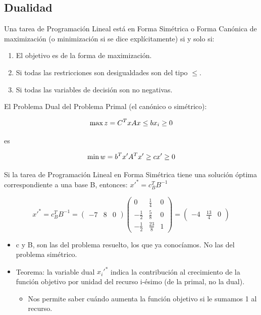 \documentclass[12pt, twoside, openright]{report} %
\begin{document}
\subsection{Dualidad}

Una tarea de Programación Lineal está en Forma Simétrica o Forma
Canónica de maximización (o minimización si se dice explícitamente) si
y solo si:

\begin{enumerate}
	\item El objetivo es de la forma de maximización.
	\item Si todas las restricciones son desigualdades son del tipo $\leq$.
	\item Si todas las variables de decisión son no negativas.
\end{enumerate}

El Problema Dual del Problema Primal (el canónico o simétrico):

\begin{minipage}{.5\linewidth}
	$$\max z = C^{T}x \\
		Ax\leq b \\
		x_{i} \geq 0$$
\end{minipage}
es
\begin{minipage}{.5\linewidth}
	$$\min w = b^{T}x' \\
		A^Tx' \geq c \\
		x' \geq 0$$
\end{minipage}

Si la tarea de Programación Lineal en Forma Simétrica tiene una
solución óptima correspondiente a una base B, entonces:
\(x'^*= c_B^TB^{-1}\)

$$x'^*=c^T_BB^{-1}=\left( \begin{matrix} -7 & 8 & 0 \end{matrix} \right) \left( \begin{matrix} 0 & \frac 1 4 & 0 \\ - \frac 1 2 & \frac 5 8 & 0 \\ - \frac 1 2 & \frac {23} 8 & 1 \end{matrix} \right) = \left( \begin{matrix} -4 & \frac {13} 4 & 0 \end{matrix} \right)$$

\begin{itemize}
	\item c y B, son las del problema resuelto, los que ya conocíamos. No las
	      del problema simétrico.
	\item Teorema: la variable dual \(x_i'^*\) indica la contribución al
	      crecimiento de la función objetivo por unidad del recurso i-ésimo
	      (de la primal, no la dual).
	      \begin{itemize}
		      \item Nos permite saber cuándo aumenta la función objetivo si le sumamos
		            1 al recurso.
	      \end{itemize}

\end{itemize}
\end{document}
